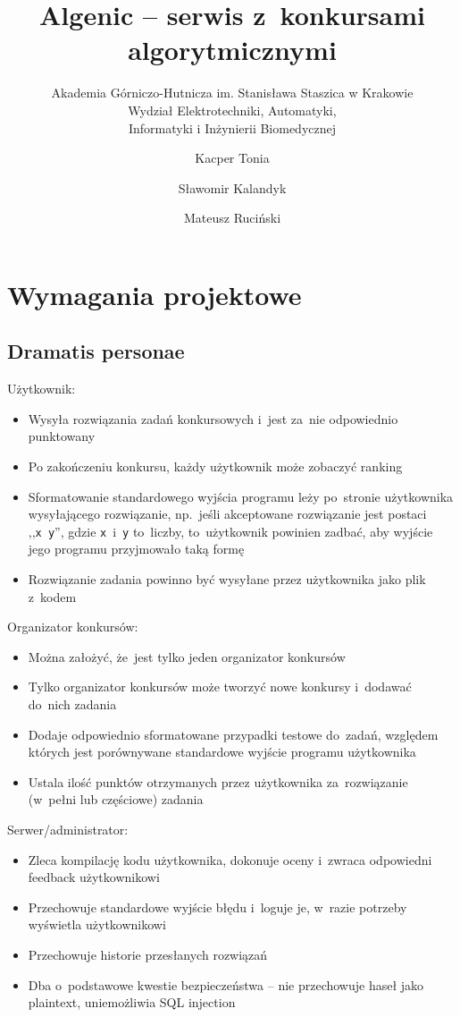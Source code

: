 \documentclass{article}
\title{Algenic -- serwis z~konkursami algorytmicznymi}
\subtitle{Akademia Górniczo-Hutnicza im. Stanisława Staszica w Krakowie\\
	Wydział Elektrotechniki, Automatyki,\\
	Informatyki i Inżynierii Biomedycznej}
\author{Kacper Tonia\and
		Sławomir Kalandyk\and
		Mateusz Ruciński}
\date{}
\begin{document}
\maketitle

\section{Wymagania projektowe}

\subsection{Dramatis personae}

Użytkownik:
\begin{itemize}
	\item Wysyła rozwiązania zadań konkursowych i~jest za~nie odpowiednio punktowany
	\item Po zakończeniu konkursu, każdy użytkownik może zobaczyć ranking
	\item Sformatowanie standardowego wyjścia programu leży po~stronie użytkownika wysyłającego rozwiązanie, np.~jeśli akceptowane rozwiązanie jest postaci ,,\texttt{x~y}'', gdzie \texttt{x}~i~\texttt{y} to~liczby, to~użytkownik powinien zadbać, aby wyjście jego programu przyjmowało taką formę
	\item Rozwiązanie zadania powinno być wysyłane przez użytkownika jako plik z~kodem
\end{itemize}

Organizator konkursów:
\begin{itemize}
	\item Można założyć, że~jest tylko jeden organizator konkursów
	\item Tylko organizator konkursów może tworzyć nowe konkursy i~dodawać do~nich zadania
	\item Dodaje odpowiednio sformatowane przypadki testowe do~zadań, względem których jest porównywane standardowe wyjście programu użytkownika
	\item Ustala ilość punktów otrzymanych przez użytkownika za~rozwiązanie (w~pełni lub częściowe) zadania
\end{itemize}

Serwer/administrator:
\begin{itemize}
	\item Zleca kompilację kodu użytkownika, dokonuje oceny i~zwraca odpowiedni feedback użytkownikowi
	\item Przechowuje standardowe wyjście błędu i~loguje je, w~razie potrzeby wyświetla użytkownikowi
	\item Przechowuje historie przesłanych rozwiązań
	\item Dba o~podstawowe kwestie bezpieczeństwa -- nie przechowuje haseł jako plaintext, uniemożliwia SQL injection
\end{itemize}
\end{document}
